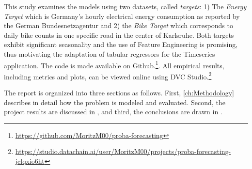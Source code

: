 This study examines the models using two datasets, called \textit{targets}: 1) The \textit{Energy Target} which is Germany's hourly electrical energy consumption \parencite{noauthor_smard_2025} as reported by the German Bundesnetzagentur and 2) the \textit{Bike Target} which corresponds to daily bike counts in one specific road in the center of Karlsruhe. Both targets exhibit significant seasonality and the use of Feature Engineering is promising, thus motivating the adaptation of tabular regressors for the Timeseries application.
The code is made available on Github.\footnote{\href{https://github.com/MoritzM00/proba-forecasting}{https://github.com/MoritzM00/proba-forecasting}}. All empirical results, including metrics and plots, can be viewed online using DVC Studio.\footnote{\href{https://studio.datachain.ai/user/MoritzM00/projects/proba-forecasting-jclqxio6ht}{https://studio.datachain.ai/user/MoritzM00/projects/proba-forecasting-jclqxio6ht}}

The report is organized into three sections as follows. First, \cref{ch:Methodology} describes in detail how the problem is modeled and evaluated. Second, the project results are discussed in , and third, the conclusions are drawn in .